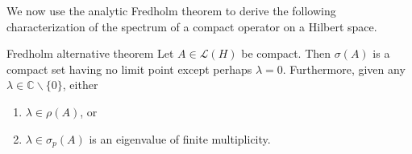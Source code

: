 We now use the analytic Fredholm theorem to derive the following characterization of the spectrum of a compact operator on a Hilbert space.

\begin{Theorem}{Fredholm alternative theorem}
\label{thm:fredholm-alternative-compact}
Let $A\in\mathcal{L}(H)$ be compact. Then $\sigma(A)$ is a compact set having no limit point except perhaps $\lambda=0$. Furthermore, given any $\lambda\in\mathbb{C}\backslash\{0\}$, either\begin{enumerate}\item $\lambda\in\rho(A)$, or\item $\lambda\in\sigma_p(A)$ is an eigenvalue of finite multiplicity.\end{enumerate}
\end{Theorem}

\begingroup
{}
\renewcommand{\endProof}{\par\nobreak\hfill$\blacksquare$\par\vspace{0.1cm}}
\endgroup
